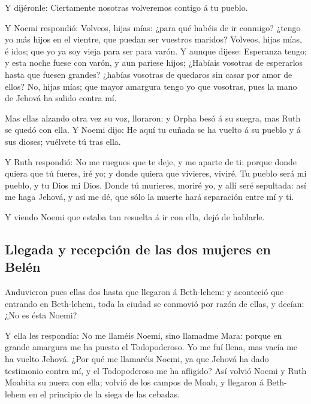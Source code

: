  Y dijéronle: Ciertamente nosotras volveremos contigo á
tu pueblo.

 Y Noemi respondió: Volveos, hijas mías: ¿para qué habéis
de ir conmigo? ¿tengo yo más hijos en el vientre, que puedan ser
vuestros maridos?  Volveos, hijas mías, é idos; que yo ya
soy vieja para ser para varón. Y aunque dijese: Esperanza tengo; y esta
noche fuese con varón, y aun pariese hijos;  ¿Habíais
vosotras de esperarlos hasta que fuesen grandes? ¿habías vosotras de
quedaros sin casar por amor de ellos? No, hijas mías; que mayor amargura
tengo yo que vosotras, pues la mano de Jehová ha salido contra mí.

 Mas ellas alzando otra vez su voz, lloraron: y Orpha
besó á su suegra, mas Ruth se quedó con ella.  Y Noemi
dijo: He aquí tu cuñada se ha vuelto á su pueblo y á sus dioses;
vuélvete tú tras ella.

 Y Ruth respondió: No me ruegues que te deje, y me aparte
de ti: porque donde quiera que tú fueres, iré yo; y donde quiera que
vivieres, viviré. Tu pueblo será mi pueblo, y tu Dios mi Dios.
 Donde tú murieres, moriré yo, y allí seré sepultada: así
me haga Jehová, y así me dé, que sólo la muerte hará separación entre mí
y ti.

 Y viendo Noemi que estaba tan resuelta á ir con ella,
dejó de hablarle.

\hypertarget{llegada-y-recepciuxf3n-de-las-dos-mujeres-en-beluxe9n}{%
\subsection{Llegada y recepción de las dos mujeres en
Belén}\label{llegada-y-recepciuxf3n-de-las-dos-mujeres-en-beluxe9n}}

 Anduvieron pues ellas dos hasta que llegaron á
Beth-lehem: y aconteció que entrando en Beth-lehem, toda la ciudad se
conmovió por razón de ellas, y decían: ¿No es ésta Noemi?

 Y ella les respondía: No me llaméis Noemi, sino llamadme
Mara: porque en grande amargura me ha puesto el Todopoderoso.
 Yo me fuí llena, mas vacía me ha vuelto Jehová. ¿Por qué
me llamaréis Noemi, ya que Jehová ha dado testimonio contra mí, y el
Todopoderoso me ha afligido?  Así volvió Noemi y Ruth
Moabita su nuera con ella; volvió de los campos de Moab, y llegaron á
Beth-lehem en el principio de la siega de las cebadas.

